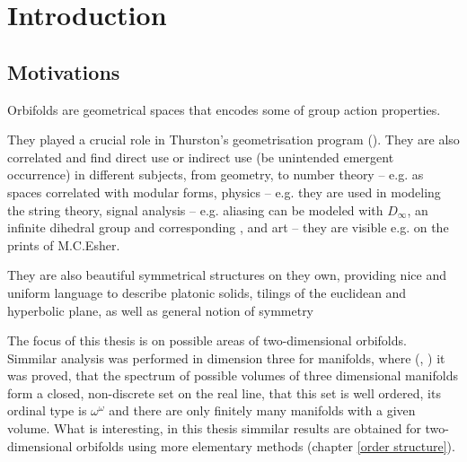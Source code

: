 \chapter{Introduction}
\setcounter{page}{9}
\section{Motivations}
Orbifolds are geometrical spaces that encodes some of group action properties. 

They played a crucial role in Thurston's geometrisation program (\cite{Thurston1979}). 
They are also correlated and find direct use or indirect use (be unintended 
emergent occurrence) 
in different subjects, 
from geometry, to number theory -- e.g. as spaces correlated with modular forms, 
physics -- e.g. they are used in modeling the string theory, 
signal analysis -- e.g. aliasing can be modeled with $D_\infty$, an 
infinite dihedral group and corresponding , and art -- they are visible e.g. 
on the prints of M.C.Esher.  

They are also beautiful symmetrical structures on they own, providing 
nice 
and uniform language to describe platonic solids, tilings of the euclidean 
and hyperbolic plane, 
as well as general notion of symmetry

The focus of this thesis is on possible areas of two-dimensional orbifolds.
Simmilar analysis was performed in dimension three for manifolds, where 
(\cite{Thurston1979}, \cite{Gromov1981}) it was proved, that the spectrum of possible volumes 
of three dimensional manifolds form a closed, non-discrete set on the real line, 
that this set is well ordered, its ordinal type is $\omega^\omega$ and there are 
only finitely many manifolds with a given volume. 
What is interesting, 
in this thesis
simmilar results 
are obtained 
for two-dimensional orbifolds 
using more elementary methods
(chapter \ref{order structure}). 

